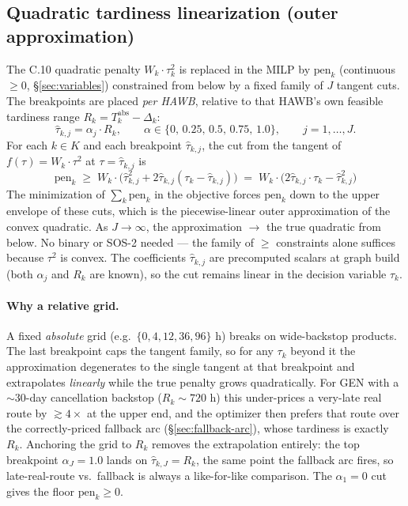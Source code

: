 \documentclass[11pt,a4paper]{article}
\theoremstyle{definition}
\begin{document}
\subsection{Quadratic tardiness linearization (outer approximation)}
\label{sec:lin-tardiness}

The C.10 quadratic penalty $W_k \cdot \tau_k^2$ is replaced in the MILP by
$\text{pen}_k$ (continuous $\geq 0$, \S\ref{sec:variables}) constrained from
below by a fixed family of $J$ tangent cuts. The breakpoints are placed
\emph{per HAWB}, relative to that HAWB's own feasible tardiness range
$R_k = T_k^{\text{abs}} - \Delta_k$:
\begin{equation*}
  \hat\tau_{k,j} = \alpha_j \cdot R_k,
  \qquad \alpha \in \{0,\, 0.25,\, 0.5,\, 0.75,\, 1.0\},
  \qquad j = 1, \ldots, J.
\end{equation*}
For each $k \in K$ and each breakpoint $\hat\tau_{k,j}$, the cut from the
tangent of $f(\tau) = W_k \cdot \tau^2$ at $\tau = \hat\tau_{k,j}$ is
\begin{equation}
  \text{pen}_k \;\geq\; W_k \cdot \bigl(\hat\tau_{k,j}^2 + 2\hat\tau_{k,j} (\tau_k - \hat\tau_{k,j})\bigr)
            \;=\; W_k \cdot \bigl(2\hat\tau_{k,j} \cdot \tau_k - \hat\tau_{k,j}^2\bigr)
  \label{eq:lin-tardiness}
\end{equation}
The minimization of $\sum_k \text{pen}_k$ in the objective forces
$\text{pen}_k$ down to the upper envelope of these cuts, which is the
piecewise-linear outer approximation of the convex quadratic. As $J \to
\infty$, the approximation $\to$ the true quadratic from below. No binary or
SOS-2 needed --- the family of $\geq$ constraints alone suffices because
$\tau^2$ is convex. The coefficients $\hat\tau_{k,j}$ are precomputed scalars
at graph build (both $\alpha_j$ and $R_k$ are known), so the cut remains
linear in the decision variable $\tau_k$.

\paragraph{Why a relative grid.}
A fixed \emph{absolute} grid (e.g.\ $\{0,4,12,36,96\}$ h) breaks on
wide-backstop products. The last breakpoint caps the tangent family, so for
any $\tau_k$ beyond it the approximation degenerates to the single tangent at
that breakpoint and extrapolates \emph{linearly} while the true penalty grows
quadratically. For GEN with a $\sim$30-day cancellation backstop ($R_k \sim
720$ h) this under-prices a very-late real route by $\gtrsim 4\times$ at the
upper end, and the optimizer then prefers that route over the
correctly-priced fallback arc (\S\ref{sec:fallback-arc}), whose tardiness is
exactly $R_k$. Anchoring the grid to $R_k$ removes the extrapolation
entirely: the top breakpoint $\alpha_J = 1.0$ lands on $\hat\tau_{k,J} = R_k$,
the same point the fallback arc fires, so late-real-route vs.\ fallback is
always a like-for-like comparison. The $\alpha_1 = 0$ cut gives the floor
$\text{pen}_k \geq 0$.
\end{document}
